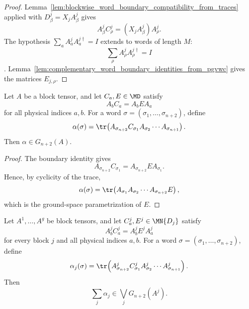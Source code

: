 \begin{proof}
    \leanok
    Lemma~\ref{lem:blockwise_word_boundary_compatibility_from_traces} applied
    with $D^j_\beta=X_jA^j_\beta$ gives
    \[
        A^j_\beta C^j_\rho=(X_jA^j_\beta)A^j_\rho.
    \]
    The hypothesis $\sum_a A^j_a A^{j\dagger}_a=I$ extends to words of
    length $M$:
    \[
        \sum_\rho A^j_\rho A^{j\dagger}_\rho=I
    \].
    Lemma~\ref{lem:complementary_word_boundary_identities_from_pgvwc} gives the
    matrices $E_{j,\rho}$.
\end{proof}

\begin{lemma}
    \label{lem:left_boundary_component_mem_ground_space}
    \leanok
    Let $A$ be a block tensor, and let $C_a,E\in \MD$
    satisfy
    \[
        A_b C_a=A_bEA_a
    \]
    for all physical indices $a,b$.  For a word
    $\sigma=(\sigma_1,\ldots,\sigma_{n+2})$, define
    \[
        \alpha(\sigma)
        =
        \tr\!\left(
        A_{\sigma_{n+2}} C_{\sigma_1}
        A_{\sigma_2}\cdots A_{\sigma_{n+1}}
        \right).
    \]
    Then $\alpha\in G_{n+2}(A)$.
\end{lemma}

\begin{proof}
    \leanok
    The boundary identity gives
    \[
        A_{\sigma_{n+2}} C_{\sigma_1}
        =
        A_{\sigma_{n+2}}EA_{\sigma_1}.
    \]
    Hence, by cyclicity of the trace,
    \[
        \alpha(\sigma)
        =
        \tr\!\left(
        A_{\sigma_1}A_{\sigma_2}\cdots A_{\sigma_{n+2}}E
        \right),
    \]
    which is the ground-space parametrization of $E$.
\end{proof}

\begin{lemma}
    \label{lem:left_boundary_summands_mem_block_ground_spaces}
    \leanok
    Let $A^1,\ldots,A^g$ be block tensors, and let
    $C^j_a,E^j\in \MN{D_j}$ satisfy
    \[
        A^j_b C^j_a=A^j_bE^jA^j_a
    \]
    for every block $j$ and all physical indices $a,b$.
    For a word $\sigma=(\sigma_1,\ldots,\sigma_{n+2})$, define
    \[
        \alpha_j(\sigma)
        =
        \tr\!\left(
        A^j_{\sigma_{n+2}} C^j_{\sigma_1}
        A^j_{\sigma_2}\cdots A^j_{\sigma_{n+1}}
        \right).
    \]
    Then
    \[
        \sum_j \alpha_j
        \in
        \bigvee_j G_{n+2}(A^j).
    \]
\end{lemma}

